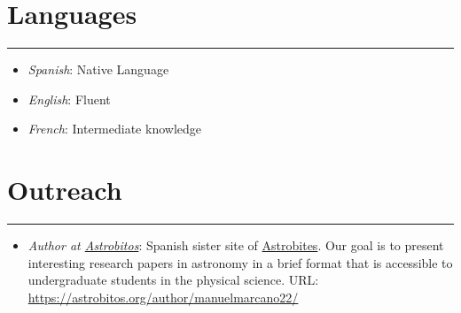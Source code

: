 \documentclass[letterpaper,10pt]{article}
\begin{document}
\section*{Languages}
\hrule
\vspace{.3 cm}
\begin{itemize}[label=$\blacktriangleright$]
\item \emph{Spanish}: Native Language
\item \emph{English}: Fluent
\item \emph{French}: Intermediate knowledge
\end{itemize}

\section*{Outreach}
\hrule
\vspace{.3 cm}
\begin{itemize}[label=$\blacktriangleright$]
\item \emph{Author at \href{https://astrobitos.org/}{Astrobitos}}:  Spanish sister site of \href{https://astrobites.org/}{Astrobites}. Our goal is to present interesting research papers in astronomy in a brief format that is accessible to undergraduate students in the physical science. URL: \url{https://astrobitos.org/author/manuelmarcano22/}
\end{itemize}





%
%
\end{document}
